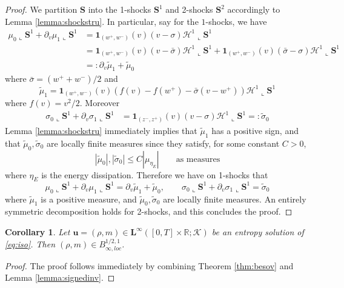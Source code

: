 \documentclass[11pt, twoside, reqno]{amsart}
\newtheorem{coro}[thm]{Corollary}
\theoremstyle{definition}
\theoremstyle{remark}
\numberwithin{equation}{section}
\newcommand{\bs}[1]{\boldsymbol{#1}}
\newcommand{\wt}[1]{\widetilde{#1}}
\begin{document}
\begin{proof}
We partition $\mathbf S$ into the 1-shocks $\mathbf S^1$ and 2-shocks $\mathbf S^2$ accordingly to Lemma \ref{lemma:shockstru}.
In particular, say for the $1$-shocks, we have 
$$
\begin{aligned}
\mu_0 \llcorner \mathbf S^1 + \partial_v \mu_1 \llcorner \mathbf S^1 & = \mathbf 1_{(w^+, w^-)}(v) (v-\sigma) \mathscr H^1 \llcorner \mathbf S^1 \\
& = \mathbf 1_{(w^+, w^-)}(v) (v-\bar \sigma) \mathscr H^1 \llcorner \mathbf S^1  +\mathbf 1_{(w^+, w^-)}(v) (\bar \sigma- \sigma) \mathscr H^1 \llcorner \mathbf S^1 \\
& = : \partial_v \wt \mu_1 + \wt \mu_0
\end{aligned}
$$
where $\bar \sigma = (w^+ + w^-)/2$ and 
$$
\wt \mu_1 = \mathbf 1_{(w^+, w^-)}(v) (f(v)- f(w^+) - \bar \sigma(v- w^+)) \mathscr H^1 \llcorner \mathbf S^1 
$$
where $f(v) = v^2/2$. Moreover
$$
\begin{aligned}
    \sigma_0\llcorner \mathbf S^1  + \partial_v \sigma_1 \llcorner \mathbf S^1 & = \mathbf 1_{(z^-, z^+)}(v)(v-\sigma) \mathscr H^1 \llcorner \mathbf S^1 =: \wt \sigma_0
\end{aligned}
$$
Lemma \ref{lemma:shockstru} immediately implies that $\wt \mu_1$ has a positive sign, and that $\wt \mu_0, \wt \sigma_0$ are locally finite measures since they  satisfy, for some constant $C> 0$, 
$$
|\wt \mu_0|, |\wt \sigma_0| \leq C |\mu_{\eta_E}| \qquad \text{as measures}
$$
where $\eta_E$ is the energy dissipation.
Therefore we have on 1-shocks that 
$$
\mu_0 \llcorner \mathbf S^1 + \partial_v \mu_1 \llcorner \mathbf S^1 = \partial_v \wt \mu_1 + \wt \mu_0, \qquad \sigma_0 \llcorner \mathbf S^1 + \partial_v \sigma_1 \llcorner \mathbf S^1 = \wt \sigma_0
$$
where $\wt \mu_1$ is a positive measure, and $\wt \mu_0, \wt \sigma_0$ are locally finite measures.  An entirely symmetric decomposition holds for 2-shocks, and this concludes the proof.
\end{proof}


\begin{coro}
    Let $\bs u =(\rho, m) \in \mathbf L^\infty([0,T] \times \mathbb R; \mathcal K)$ be an entropy solution of \eqref{eq:iso}. Then $(\rho, m) \in B^{1/2, 1}_{\infty, loc}$.
\end{coro}
\begin{proof}
    The proof follows immediately by combining Theorem \ref{thm:besov} and Lemma \ref{lemma:signedinv}.
\end{proof}
\end{document}
